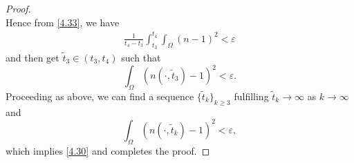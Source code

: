 \documentclass[10pt,a4paper]{amsart}
\begin{document}
\begin{proof}[Proof]
$$$$
Hence from \eqref{4.33}, we have
\begin{equation*}
\begin{split}
\frac{1}{t_4-t_3}\int^{t_4}_{t_3}\int_\Omega(n-1)^2
< \varepsilon\end{split}
\end{equation*}
and then get $\tilde{t}_3\in (t_3,t_4)$ such that
\begin{equation}
\int_\Omega(n(\cdot,\tilde{t}_3)-1)^2
< \varepsilon.
\end{equation}
Proceeding as above, we can find a sequence $\{\tilde{t}_k\}_{k\geq 3}$ fulfilling
$\tilde{t}_k\rightarrow \infty$ as $k\rightarrow \infty$ and
\begin{equation*}
\int_\Omega(n(\cdot,\tilde{t}_k)-1)^2< \varepsilon,
\end{equation*}
which implies \eqref{4.30} and completes the proof.
\end{proof}
\end{document}
